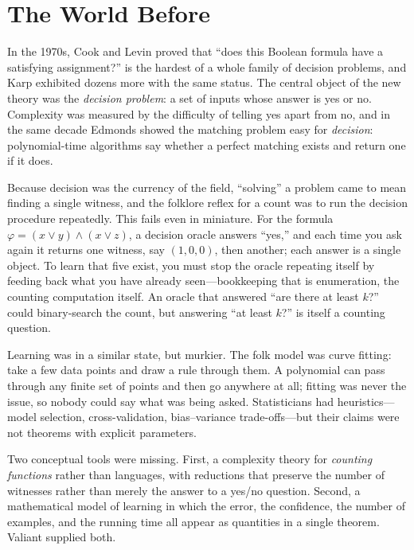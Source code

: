 \section{The World Before}
In the 1970s, Cook and Levin proved that ``does this Boolean formula have a satisfying assignment?'' is the hardest of a whole family of decision problems, and Karp exhibited dozens more with the same status. The central object of the new theory was the \emph{decision problem}: a set of inputs whose answer is yes or no. Complexity was measured by the difficulty of telling yes apart from no, and in the same decade Edmonds showed the matching problem easy for \emph{decision}: polynomial-time algorithms say whether a perfect matching exists and return one if it does.

Because decision was the currency of the field, ``solving'' a problem came to mean finding a single witness, and the folklore reflex for a count was to run the decision procedure repeatedly. This fails even in miniature. For the formula \(\varphi=(x\vee y)\wedge(x\vee z)\), a decision oracle answers ``yes,'' and each time you ask again it returns one witness, say \((1,0,0)\), then another; each answer is a single object. To learn that five exist, you must stop the oracle repeating itself by feeding back what you have already seen---bookkeeping that is enumeration, the counting computation itself. An oracle that answered ``are there at least \(k\)?'' could binary-search the count, but answering ``at least \(k\)?'' is itself a counting question.

Learning was in a similar state, but murkier. The folk model was curve fitting: take a few data points and draw a rule through them. A polynomial can pass through any finite set of points and then go anywhere at all; fitting was never the issue, so nobody could say what was being asked. Statisticians had heuristics---model selection, cross-validation, bias--variance trade-offs---but their claims were not theorems with explicit parameters.

Two conceptual tools were missing. First, a complexity theory for \emph{counting functions} rather than languages, with reductions that preserve the number of witnesses rather than merely the answer to a yes/no question. Second, a mathematical model of learning in which the error, the confidence, the number of examples, and the running time all appear as quantities in a single theorem. Valiant supplied both.

